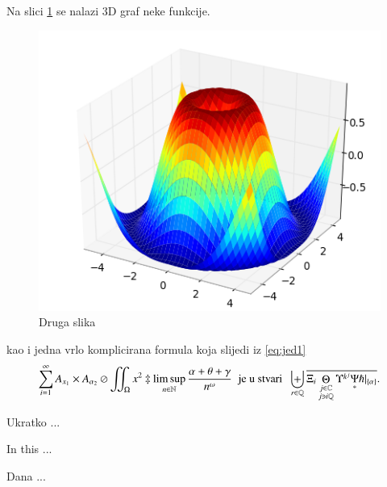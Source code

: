 \documentclass[a4paper,twoside,12pt]{memoir} %
\begin{document}
Na slici \ref{fig:3d} se nalazi 3D graf neke funkcije. 

\begin{figure}[h!t]
\centering \includegraphics{surface3d.png}
\caption{Druga slika}
\label{fig:3d}
\end{figure}

kao i jedna vrlo komplicirana formula koja slijedi iz \eqref{eq:jed1}
\[ \sum_{i=1}^{\infty}A_{x_1}\times A_{{\alpha}_2}\oslash\iint_{\Omega}x^2\ddagger\limsup_{n\in\mathbb{N}}\frac{\alpha+\theta+\gamma}{n^{\omega}}\;\;\text{je u stvari}\;\;\biguplus_{r\in\mathbb{Q}}\overline{\Xi_i \mathop\Theta_{\substack{j\in\mathbb{C} \\ j\ni i\mathbb{Q}}} \Upsilon^{k^j} \underset{\ast}{\Psi} \hslash\vert_{\{\alpha\}}}.\]




\pagestyle{empty} %


\begin{sazetak}
Ukratko ...
\end{sazetak}

\begin{summary}
In this ...
\end{summary}


\begin{cv}
Dana ...
\end{cv}
\end{document}
